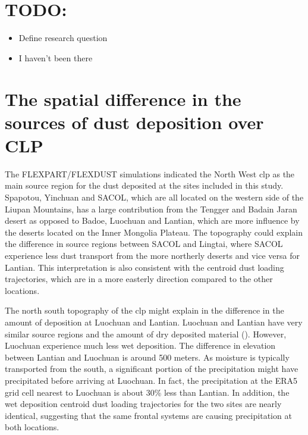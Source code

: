 \label{chap:Discussion}
  
\section{TODO:}

\begin{itemize}
    \item Define research question
    \item I haven't been there
\end{itemize}

\section{The spatial difference in the sources of dust deposition over CLP}
The FLEXPART/FLEXDUST simulations indicated the North West \acrshort{clp} as the main source region for the dust deposited at the sites included in this study. Spapotou, Yinchuan and SACOL, which are all located on the western side of the Liupan Mountains, has a large contribution from the Tengger and Badain Jaran desert as opposed to Badoe, Luochuan and Lantian, which are more influence by the deserts located on the Inner Mongolia Plateau. The topography could explain the difference in source regions between SACOL and Lingtai, where SACOL experience less dust transport from the more northerly deserts and vice versa for Lantian. This interpretation is also consistent with the centroid dust loading trajectories, which are in a more easterly direction compared to the other locations. 

The north south topography of the \acrshort{clp} might explain in the difference in the amount of deposition at Luochuan and Lantian. Luochuan and Lantian have very similar source regions and the amount of dry deposited material (). However, Luochuan experience much less wet deposition. The difference in elevation between Lantian and Luochuan is around 500 meters. As moisture is typically transported from the south, a significant portion of the precipitation might have precipitated before arriving at Luochuan. In fact, the precipitation at the ERA5 grid cell nearest to Luochuan is about 30\% less than Lantian. In addition, the wet deposition centroid dust loading trajectories for the two sites are nearly identical, suggesting that the same frontal systems are causing precipitation at both locations.              



